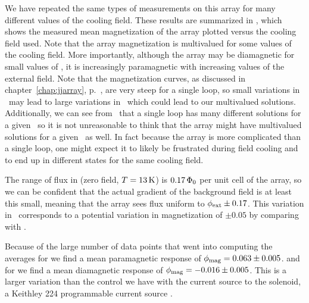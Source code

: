 We have repeated the same types of measurements on this array for 
many different values of the cooling field. These results are 
summarized in , which shows the 
measured mean magnetization of the array plotted versus the cooling
field used. Note that the array magnetization is multivalued for some
values of the cooling field. More importantly, although the array may
be diamagnetic for small values of \phiext, it is increasingly
paramagnetic with increasing values of the external field. 
Note that the magnetization curves, as discussed in chapter~\ref{chap:jjarray},
p.~\pageref{jjarray:single_loop_mag}, are very steep for a single loop,
so small variations in \phiext\ may lead to large variations in \phimag\
which could lead to our multivalued solutions. Additionally, we can
see from \EqnRef{eqn:steadystatesolution}\ that a single loop has 
many different solutions for a given \phiext\ so it is not 
unreasonable to think that the array might have multivalued
solutions for a given \phiext\ as well. In fact because the
array is more complicated than a single loop, one might 
expect it to likely be frustrated during field
cooling and to end up in different states for the
same cooling field. 

The range of flux in 
 (zero field, $T=13\,\kelvin$)
is $0.17\,\Phinot$ per unit cell of the 
array, so we can be confident that the actual gradient of 
the background field is at least this small, meaning that the
array sees flux uniform to $\phiext \pm 0.17$. 
This variation in \phiext\ corresponds to a potential variation
in magnetization of $\pm 0.05$ by comparing with 
.

Because of the large number of data points that went into computing the 
averages for \FigRef{fig:paramag_image_b} we find
a mean paramagnetic response of $\phimag = 0.063\pm 0.005$.
and for  we find a mean diamagnetic
response of $\phimag = -0.016 \pm 0.005$. This is a larger
variation than the control we have with the current source to the
solenoid, a Keithley 224 programmable current source
\cite{keithley_instr}.

